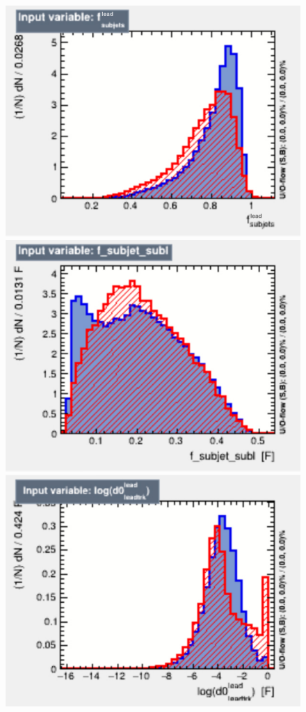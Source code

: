 \begin{figure}[th!]
    \includegraphics[width=\individualPlotWidth]{Assets/Plots/DiTau/BDT_vars/f_subjet_lead.pdf}
    \includegraphics[width=\individualPlotWidth]{Assets/Plots/DiTau/BDT_vars/f_subjet_subl.pdf}
    \includegraphics[width=\individualPlotWidth]{Assets/Plots/DiTau/BDT_vars/d0_leadtrack_lead.pdf}

\end{figure}
